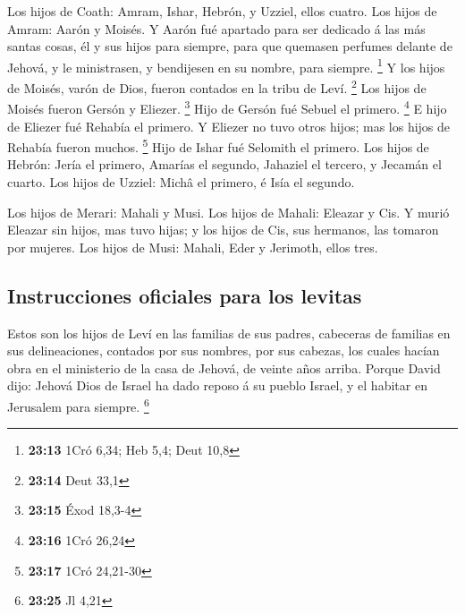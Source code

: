  Los hijos de Coath: Amram, Ishar, Hebrón, y Uzziel, ellos
cuatro.  Los hijos de Amram: Aarón y Moisés. Y Aarón fué
apartado para ser dedicado á las más santas cosas, él y sus hijos para
siempre, para que quemasen perfumes delante de Jehová, y le ministrasen,
y bendijesen en su nombre, para siempre. \footnote{\textbf{23:13} 1Cró
  6,34; Heb 5,4; Deut 10,8}  Y los hijos de Moisés, varón
de Dios, fueron contados en la tribu de Leví. \footnote{\textbf{23:14}
  Deut 33,1}  Los hijos de Moisés fueron Gersón y Eliezer.
\footnote{\textbf{23:15} Éxod 18,3-4}  Hijo de Gersón fué
Sebuel el primero. \footnote{\textbf{23:16} 1Cró 26,24}  E
hijo de Eliezer fué Rehabía el primero. Y Eliezer no tuvo otros hijos;
mas los hijos de Rehabía fueron muchos. \footnote{\textbf{23:17} 1Cró
  24,21-30}  Hijo de Ishar fué Selomith el primero.
 Los hijos de Hebrón: Jería el primero, Amarías el segundo,
Jahaziel el tercero, y Jecamán el cuarto.  Los hijos de
Uzziel: Michâ el primero, é Isía el segundo.

 Los hijos de Merari: Mahali y Musi. Los hijos de Mahali:
Eleazar y Cis.  Y murió Eleazar sin hijos, mas tuvo hijas;
y los hijos de Cis, sus hermanos, las tomaron por mujeres. 
Los hijos de Musi: Mahali, Eder y Jerimoth, ellos tres.

\hypertarget{instrucciones-oficiales-para-los-levitas}{%
\subsection{Instrucciones oficiales para los
levitas}\label{instrucciones-oficiales-para-los-levitas}}

 Estos son los hijos de Leví en las familias de sus padres,
cabeceras de familias en sus delineaciones, contados por sus nombres,
por sus cabezas, los cuales hacían obra en el ministerio de la casa de
Jehová, de veinte años arriba.  Porque David dijo: Jehová
Dios de Israel ha dado reposo á su pueblo Israel, y el habitar en
Jerusalem para siempre. \footnote{\textbf{23:25} Jl 4,21}

